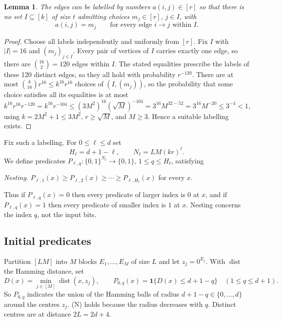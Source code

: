 \documentclass[11pt]{article}
\newtheorem{lemma}[theorem]{Lemma}
\theoremstyle{definition}
\theoremstyle{remark}
\begin{document}
\begin{lemma}\label{lem:labelling}
The edges can be labelled by numbers \(a(i,j)\in[r]\) so that there is
no set \(I\subseteq[k]\) of size \(t\) admitting choices
\(m_j\in[r]\), \(j\in I\), with
\[
 a(i,j)=m_j \qquad\text{for every edge }i\to j\text{ within }I.
\]
\end{lemma}
\begin{proof}
Choose all labels independently and uniformly from \([r]\). Fix \(I\) with
$|I|=16$ and \((m_j)_{j\in I}\). Every pair of vertices of $I$ carries exactly
one edge, so there are $\binom{16}{2}=120$ edges within $I$. The stated
equalities prescribe the labels of these 120 distinct edges, so they all hold
with probability \(r^{-120}\). There are at most
$\binom{k}{16}r^{16}\le k^{16}r^{16}$ choices of $(I,(m_j))$, so the
probability that some choice satisfies all its equalities is at most
\[
 k^{16}r^{16}r^{-120}=k^{16}r^{-104}\le (3M^2)^{16}(\sqrt M)^{-104}
 =3^{16}M^{32-52}=3^{16}M^{-20}\le3^{-4}<1,
\]
using \(k=2M^2+1\le3M^2\), \(r\ge\sqrt M\), and \(M\ge3\). Hence a suitable
labelling exists.
\end{proof}

Fix such a labelling. For \(0\le\ell\le d\) set
\[
 H_\ell=d+1-\ell,\qquad N_\ell=LM(kr)^\ell.
\]
We define predicates \(P_{\ell,q}:\{0,1\}^{N_\ell}\to\{0,1\}\),
\(1\le q\le H_\ell\), satisfying
\begin{description}[leftmargin=*,itemsep=1pt]
\item[\textup{(N)}] \emph{Nesting.}
 \(P_{\ell,1}(x)\ge P_{\ell,2}(x)\ge\cdots\ge P_{\ell,H_\ell}(x)\) for every
 \(x\).
\end{description}
Thus if $P_{\ell,q}(x)=0$ then every predicate of larger index is $0$ at
$x$, and if $P_{\ell,q}(x)=1$ then every predicate of smaller index is $1$ at
$x$. Nesting concerns the index $q$, not the input bits.

\subsection{Initial predicates}
Partition \([LM]\) into \(M\) blocks \(E_1,\ldots,E_M\) of size \(L\) and let
\(z_j=0^{E_j}\). With \(\operatorname{dist}\) the Hamming distance, set
\[
 D(x)=\min_{j\in[M]}\operatorname{dist}(x,z_j),\qquad
 P_{0,q}(x)=\mathbf1\{D(x)\le d+1-q\}\quad(1\le q\le d+1).
\]
So $P_{0,q}$ indicates the union of the Hamming balls of radius
$d+1-q\in\{0,\ldots,d\}$ around the centres $z_j$. (N) holds because the
radius decreases with $q$. Distinct centres are at distance \(2L=2d+4\).
\end{document}
